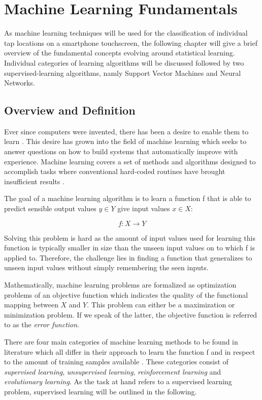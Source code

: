 \chapter{Machine Learning Fundamentals}
As machine learning techniques will be used for the classification of individual tap locations on a smartphone touchscreen, the following chapter will give a brief overview of the fundamental concepts evolving around statistical learning. Individual categories of learning algorithms will be discussed followed by two supervised-learning algorithms, namly Support Vector Machines and Neural Networks.

\section{Overview and Definition}

Ever since computers were invented, there has been a desire to enable them to learn \cite{samuel2000some}. This desire has grown into the field of machine learning which seeks to answer questions on how to build systems that automatically improve with experience. Machine learning covers a set of methods and algorithms designed to accomplish tasks where conventional hard-coded routines have brought insufficient results \cite{mitchell2006discipline}.

The goal of a machine learning algorithm is to learn a function f that is able to predict sensible output values $y \in Y$ give input values $x \in X$:

\begin{equation}
  f: X \rightarrow Y
\end{equation}

Solving this problem is hard as the amount of input values used for learning this function is typically smaller in size than the unseen input values on to which f is applied to. Therefore, the challenge lies in finding a function that generalizes to unseen input values without simply remembering the seen inputs.

Mathematically, machine learning problems are formalized as optimization problems of an objective function which indicates the quality of the functional mapping between $X$ and $Y$. This problem can either be a maximization or minimization problem. If we speak of the latter, the objective function is referred to as the \textit{error function}.

There are four main categories of machine learning methods to be found in literature which all differ in their approach to learn the function f and in respect to the amount of training samples available \cite{Duda:2000:PC:954544, Marsland:2009:MLA:1571643}. These categories consist of \textit{supervised learning}, \textit{unsupervised learning}, \textit{reinforcement learning} and \textit{evolutionary learning}. As the task at hand refers to a supervised learning problem, supervised learning will be outlined in the following.

